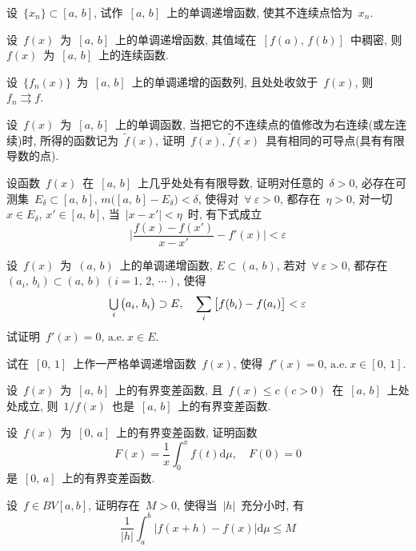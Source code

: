 \newpage
\begin{problemset}

  \item 设~$\{x_n\} \subset [a,\,b]$, 试作~$[a,\,b]$~上的单调递增函数, 使其不连续点恰为~$x_n$.

  \item 设~$f(x)$~为~$[a,\,b]$~上的单调递增函数, 其值域在~$[f(a),\,f(b)]$~中稠密,       则~$f(x)$~为~$[a,\,b]$~上的连续函数.

  \item 设~$\{f_n(x)\}$~为~$[a,\,b]$~上的单调递增的函数列, 且处处收敛于~$f(x)$, 则~$f_n \rightrightarrows f$.

  \item 设~$f(x)$~为~$[a,\,b]$~上的单调函数, 当把它的不连续点的值修改为右连续(或左连续)时,       所得的函数记为~$\tilde{f}(x)$, 证明~$f(x),\,\tilde{f}(x)$~具有相同的可导点(具有有限导数的点).

  \item 设函数~$f(x)$~在~$[a,\,b]$~上几乎处处有有限导数, 证明对任意的~$\delta > 0$, 必存在可测集~$E_\delta \subset [a,\,b], \, m\big( [a,\,b]-E_\delta\big) <\delta$, 使得对~$\forall~\varepsilon > 0$, 都存在~$\eta > 0$, 对一切~$x \in E_\delta$, $x' \in [a,\,b]$, 当~$|x-x'| < \eta$~时, 有下式成立
      \[
      \Big| \frac{f(x)-f(x')}{x-x'} -f'(x) \Big| < \varepsilon
      \]

  \item 设~$f(x)$~为~$(a,\,b)$~上的单调递增函数, $E \subset (a,\,b)$, 若对~$\forall~\varepsilon > 0$, 都存在~$(a_i,\,b_i) \subset (a,\,b)~(i=1,\,2,\,\cdots)$, 使得
      \[
      \mathop{\textstyle{\bigcup}}_i \big(a_i,\,b_i\big) \supset E, \quad \sum_i \big[ f(b_i)-f(a_i) \big] < \varepsilon
      \]
      试证明~$f'(x)=0,\,\mathrm{a.e.~} x \in E$.

  \item 试在~$[0,\,1]$~上作一严格单调递增函数~$f(x)$, 使得~$f'(x)=0,\,\mathrm{a.e.~} x \in [0,\,1]$.

  \item 设~$f(x)$~为~$[a,\,b]$~上的有界变差函数, 且~$f(x) \leqslant c \, (c  > 0)$~在~$[a,\,b]$~上处处成立, 则~$1/f(x)$~也是~$[a,\,b]$~上的有界变差函数.

  \item 设~$f(x)$~为~$[0,\,a]$~上的有界变差函数, 证明函数
  \[
  F(x) = \frac{1}{x}\int_0^x f(t) \mathrm{d} \mu, \quad F(0)=0
  \]
  是~$[0,\,a]$~上的有界变差函数.

  \item 设~$f \in BV[a,b]$, 证明存在~$M > 0$, 使得当~$|h|$~充分小时, 有
  \[
  \frac{1}{|h|}\int_a^b \big| f(x+h)-f(x) \big| \mathrm{d} \mu \leqslant M
  \]


\end{problemset}
